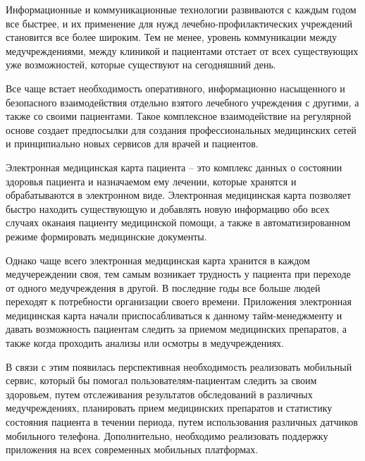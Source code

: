 \label{sec:intro}

Информационные и коммуникационные технологии развиваются с каждым годом все быстрее, и их применение для нужд лечебно-профилактических учреждений становится все более широким. Тем не менее, уровень коммуникации между медучреждениями, между клиникой и пациентами отстает от всех существующих уже возможностей, которые существуют на сегодняшний день.

Все чаще встает необходимость оперативного, информационно насыщенного и безопасного взаимодействия отдельно взятого лечебного учреждения с другими, а также со своими пациентами. Такое комплексное взаимодействие на регулярной основе создает предпосылки для создания профессиональных медицинских сетей и принципиально новых сервисов для врачей и пациентов.

Электронная медицинская карта пациента – это комплекс данных о состоянии здоровья пациента и назначаемом ему лечении, которые хранятся и обрабатываются в электронном виде.
Электронная медицинская карта позволяет быстро находить существующую и добавлять новую информацию обо всех случаях оканаия пациенту медицинской помощи, а также в автоматизированном режиме формировать медицинские документы.

Однако чаще всего электронная медицинская карта хранится в каждом медучереждении своя, тем самым возникает трудность у пациента при переходе от одного медучреждения в другой. 
В последние годы все больше людей переходят к потребности организации своего времени. Приложения электронная медицинская карта начали приспосабливаться к данному тайм-менеджменту и давать возможность пациентам следить за приемом медицинских препаратов, а также когда проходить анализы или осмотры в медучреждениях. 

В связи с этим появилась перспективная необходимость реализовать мобильный сервис, который бы помогал пользователям-пациентам следить за своим здоровьем, путем отслеживания результатов обследований в различных медучреждениях, планировать прием медицинских препаратов и статистику состояния пациента в течении периода, путем использования различных датчиков мобильного телефона. Дополнительно, необходимо реализовать поддержку приложения на всех современных мобильных платформах.
